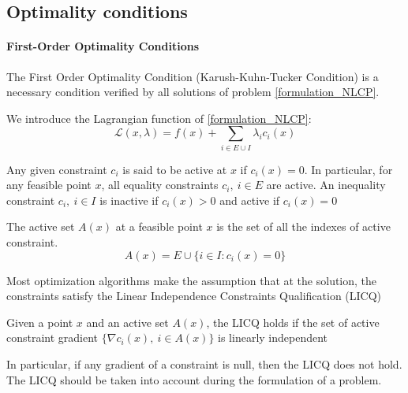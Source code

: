 \subsection{Optimality conditions}

\paragraph{First-Order Optimality Conditions}

The First Order Optimality Condition (Karush-Kuhn-Tucker Condition) is a necessary condition verified by all solutions of problem \ref{formulation_NLCP}.

We introduce the Lagrangian function of \ref{formulation_NLCP}:
\begin{equation}
  \mathcal{L}(x,\lambda) = f(x) + \sum_{i\in E\cup I}\lambda_i c_i(x)
\end{equation}

Any given constraint $c_i$ is said to be active at $x$ if $c_i(x)=0$.
In particular, for any feasible point $x$, all equality constraints $c_i,\ i\in E$ are active. 
An inequality constraint $c_i,\ i\in I$ is inactive if $c_i(x)>0$ and active if $c_i(x) = 0$

\begin{definition}  
  \label{active_set}
  The active set $\mathit{A}(x)$ at a feasible point $x$ is the set of all the indexes of active constraint.
  \begin{equation}
    \mathit{A}(x)=E\cup\{i\in I: c_i(x) = 0\}
  \end{equation}
\end{definition}

Most optimization algorithms make the assumption that at the solution, the constraints satisfy the Linear Independence Constraints Qualification (LICQ)

\begin{definition}
  Given a point $x$ and an active set $\mathit{A}(x)$, the LICQ holds if the set of active constraint gradient $\{\nabla c_i(x),\ i\in \mathit{A}(x)\}$ is linearly independent
\end{definition}

In particular, if any gradient of a constraint is null, then the LICQ does not hold. 
The LICQ should be taken into account during the formulation of a problem.

